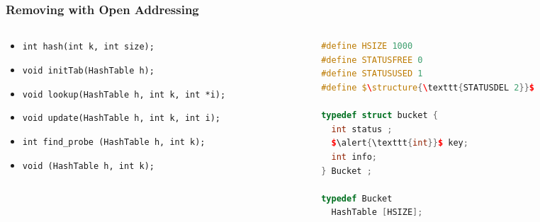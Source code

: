 \documentclass[aspectratio=169]{beamer}
\begin{document}
\begin{frame}[fragile]\frametitle{Removing with Open Addressing}
\begin{columns}
\begin{column}{.71\textwidth}
%
\begin{itemize}
  \item \textcolor{black!40}{\texttt{int hash(\alert{\texttt{int}} k, int size);}}
  \item \textcolor{black!40}{\texttt{void initTab(HashTable h);}}
  \item \textcolor{black!40}{\texttt{void lookup(HashTable h, \alert{\texttt{int}} k, int *i);}}
  \item \textcolor{black!40}{\texttt{void update(HashTable h, \alert{\texttt{int}} k, int i);}}
  \item \textcolor{black!40}{\texttt{int find\_probe (HashTable h, \alert{\texttt{int}} k);}}
  \item \texttt{void (HashTable h, \alert{\texttt{int}} k);}
\end{itemize}
%
\end{column}
\begin{column}{.34\textwidth}
%
\begin{lstlisting}[language=C++,emph={HashTable,Bucket}]
#define HSIZE 1000
#define STATUSFREE 0
#define STATUSUSED 1
#define $\structure{\texttt{STATUSDEL 2}}$

typedef struct bucket {
  int status ;
  $\alert{\texttt{int}}$ key;
  int info;
} Bucket ;

typedef Bucket
  HashTable [HSIZE];
\end{lstlisting}
%
\end{column}
\end{columns}

~\\[-6mm]
\doSimpleExercise{How would you implement \texttt{update}?
\\How would you implement a \emph{garbageCollect} that removes deleted cells? 
\\What is their complexity?}
\end{frame}

\end{document}
